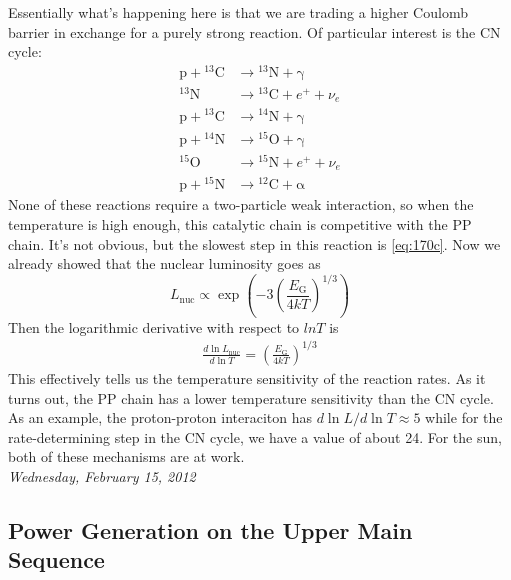 \documentclass[10pt]{article}
\numberwithin{equation}{section}
\newcommand{\n}{\noindent}
\begin{document}
  Essentially what's happening here is that we are trading a higher
  Coulomb barrier in exchange for a purely strong reaction. Of
  particular interest is the CN cycle:
  \begin{align}
    \label{eq:170}
    \mathrm{p+{}^{13}C} & \to \mathrm{{}^{13}N+\gamma}\\
    \label{eq:170a}
    \mathrm{{}^{13}N} & \to \mathrm{{}^{13}C+}e^++\nu_e\\
    \label{eq:170b}
    \mathrm{p+{}^{13}C} &\to \mathrm{{}^{14}N+\gamma}\\
    \label{eq:170c}
    \mathrm{p+{}^{14}N} &\to \mathrm{{}^{15}O+\gamma}\\
    \label{eq:170d}
    \mathrm{{}^{15}O} &\to\mathrm{{}^{15}N}+e^++\nu_e\\
    \label{eq:170e}
    \mathrm{p+{}^{15}N} &\to\mathrm{{}^{12}C+\alpha}
  \end{align}
  None of these reactions require a two-particle weak interaction, so
  when the temperature is high enough, this catalytic chain is
  competitive with the PP chain. It's not obvious, but the slowest
  step in this reaction is \eqref{eq:170c}. Now we already showed that
  the nuclear luminosity goes as
  \begin{equation}
    \label{eq:171}
    L_{\mathrm{nuc}}\propto
    \exp\left(-3\left(\frac{E_{\mathrm{G}}}{4kT}\right)^{1/3}\right)
  \end{equation}
  Then the logarithmic derivative with respect to $ln T$ is
  \begin{align}
    \label{eq:172}
    \frac{d\ln L_{\mathrm{nuc}}}{d\ln T}=\left(\frac{E_{\mathrm{G}}}{4kT}\right)^{1/3}
  \end{align}
  This effectively tells us the temperature sensitivity of the
  reaction rates. As it turns out, the PP chain has a lower
  temperature sensitivity than the CN cycle. As an example, the
  proton-proton interaciton has $d\ln L/d\ln T\approx 5$ while for the
  rate-determining step in the CN cycle, we have a value of about
  24. For the sun, both of these mechanisms are at work.\\

\n \textit{Wednesday, February 15, 2012}

  \subsection{Power Generation on the Upper Main Sequence}
  \label{sec:power-gener-upper}
\end{document}
